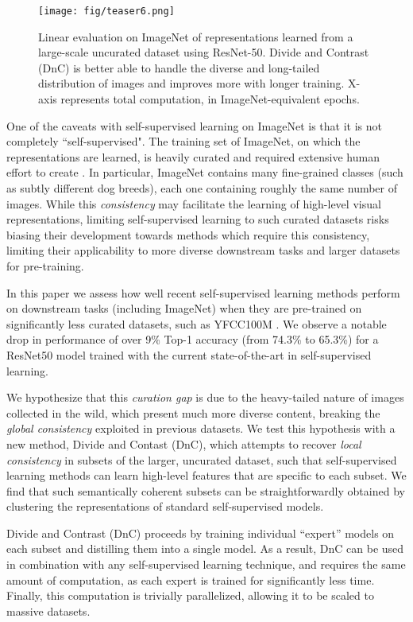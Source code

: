 \documentclass[final]{cvpr}
\begin{document}
\begin{figure}[t]
  \centering
  \texttt{[image: fig/teaser6.png]}
  \caption{Linear evaluation on ImageNet of representations learned from a large-scale uncurated dataset using ResNet-50. Divide and Contrast (DnC) is better able to handle the diverse and long-tailed distribution of images and improves more with longer training. X-axis represents total computation, in ImageNet-equivalent epochs. }\label{fig:teaser}
\end{figure}

One of the caveats with self-supervised learning on ImageNet is that it is not completely ``self-supervised". 
The training set of ImageNet, on which the representations are learned, is heavily curated and required extensive human effort to create \cite{deng2009imagenet}. 
In particular, ImageNet contains many fine-grained classes (such as subtly different dog breeds), each one containing roughly the same number of images. 
While this \textit{consistency} may facilitate the learning of high-level visual representations, limiting self-supervised learning to such curated datasets risks biasing their development towards methods which require this consistency, limiting their applicability to more diverse downstream tasks and larger datasets for pre-training.

In this paper we assess how well recent self-supervised learning methods perform on downstream tasks (including ImageNet) when they are pre-trained on significantly less curated datasets, such as YFCC100M \cite{thomee2016yfcc100m}. We observe a notable drop in performance of over 9\% Top-1 accuracy (from 74.3\% to 65.3\%) for a ResNet50 model trained with the current state-of-the-art in self-supervised learning.


We hypothesize that this \emph{curation gap} is due to the heavy-tailed nature of images collected in the wild, which present much more diverse content, breaking the \textit{global consistency} exploited in previous datasets. We test this hypothesis with a new method, Divide and Contast (DnC), which attempts to recover
\textit{local consistency} in subsets of the larger, uncurated dataset, such that self-supervised learning methods can learn high-level features that are specific to each subset. We find that such semantically coherent subsets can be straightforwardly obtained by clustering the representations of standard self-supervised models.


Divide and Contrast (DnC) proceeds by training individual ``expert'' models on each subset and distilling them into a single model. As a result, DnC can be used in combination with any self-supervised learning technique, and requires the same amount of computation, as each expert is trained for significantly less time. Finally, this computation is trivially parallelized, allowing it to be scaled to massive datasets. 
\end{document}
